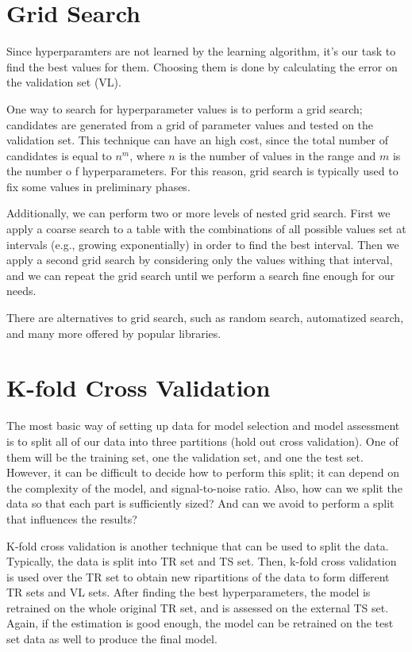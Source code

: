 \section{Grid Search}

Since hyperparamters are not learned by the learning algorithm, it's our task to find the best values for them. Choosing them is done by calculating the error on the validation set (VL). 

One way to search for hyperparameter values is to perform a grid search; candidates are generated from a grid of parameter values and tested on the validation set. This technique can have an high cost, since the total number of candidates is equal to $n^m$, where $n$ is the number of values in the range and $m$ is the number o f hyperparameters. For this reason, grid search is typically used to fix some values in preliminary phases.

Additionally, we can perform two or more levels of nested grid search. First we apply a coarse search to a table with the combinations of all possible values set at intervals (e.g., growing exponentially) in order to find the best interval. Then we apply a second grid search by considering only the values withing that interval, and we can repeat the grid search until we perform a search fine enough for our needs.

There are alternatives to grid search, such as random search, automatized search, and many more offered by popular libraries.

\section{K-fold Cross Validation}

The most basic way of setting up data for model selection and model assessment is to split all of our data into three partitions (hold out cross validation). One of them will be the training set, one the validation set, and one the test set. However, it can be difficult to decide how to perform this split; it can depend on the complexity of the model, and signal-to-noise ratio. Also, how can we split the data so that each part is sufficiently sized? And can we avoid to perform a split that influences the results?

K-fold cross validation is another technique that can be used to split the data. Typically, the data is split into TR set and TS set. Then, k-fold cross validation is used over the TR set to obtain new ripartitions of the data to form different TR sets and VL sets. After finding the best hyperparameters, the model is retrained on the whole original TR set, and is assessed on the external TS set. Again, if the estimation is good enough, the model can be retrained on the test set data as well to produce the final model.

